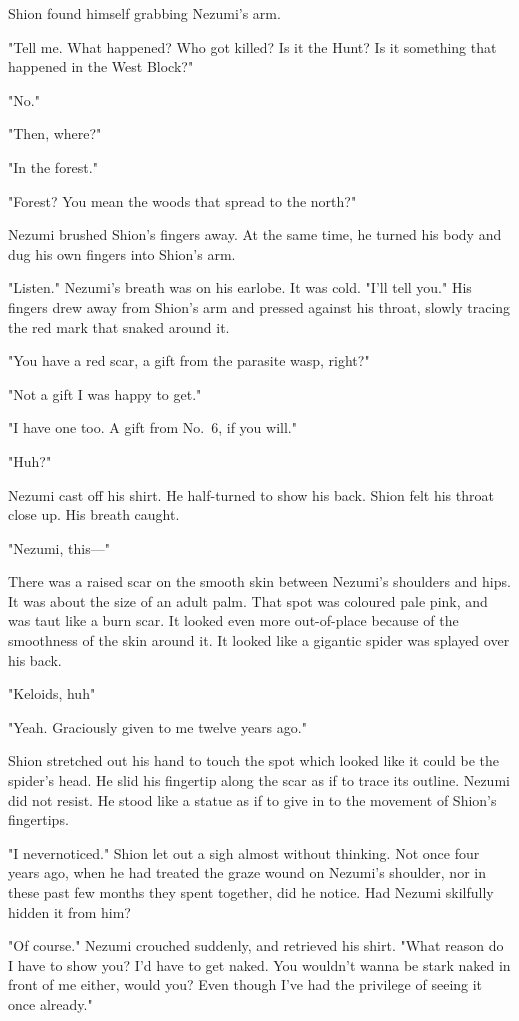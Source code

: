 Shion found himself grabbing Nezumi's arm.

"Tell me. What happened? Who got killed? Is it the Hunt? Is it something
that happened in the West Block?"

"No."

"Then, where?"

"In the forest."

"Forest? You mean the woods that spread to the north?"

Nezumi brushed Shion's fingers away. At the same time, he turned his
body and dug his own fingers into Shion's arm.

"Listen." Nezumi's breath was on his earlobe. It was cold. "I'll tell
you." His fingers drew away from Shion's arm and pressed against his
throat, slowly tracing the red mark that snaked around it.

"You have a red scar, a gift from the parasite wasp, right?"

"Not a gift I was happy to get."

"I have one too. A gift from No.~6, if you will."

"Huh?"

Nezumi cast off his shirt. He half-turned to show his back. Shion felt
his throat close up. His breath caught.

"Nezumi, this---"

There was a raised scar on the smooth skin between Nezumi's shoulders
and hips. It was about the size of an adult palm. That spot was coloured
pale pink, and was taut like a burn scar. It looked even more
out-of-place because of the smoothness of the skin around it. It looked
like a gigantic spider was splayed over his back.

"Keloids, huh\el "

"Yeah. Graciously given to me twelve years ago."

Shion stretched out his hand to touch the spot which looked like it
could be the spider's head. He slid his fingertip along the scar as if
to trace its outline. Nezumi did not resist. He stood like a statue as
if to give in to the movement of Shion's fingertips.

"I never\el noticed." Shion let out a sigh almost without thinking. Not
once four years ago, when he had treated the graze wound on Nezumi's
shoulder, nor in these past few months they spent together, did he
notice. Had Nezumi skilfully hidden it from him?

"Of course." Nezumi crouched suddenly, and retrieved his shirt. "What
reason do I have to show you? I'd have to get naked. You wouldn't wanna
be stark naked in front of me either, would you? Even though I've had
the privilege of seeing it once already."

